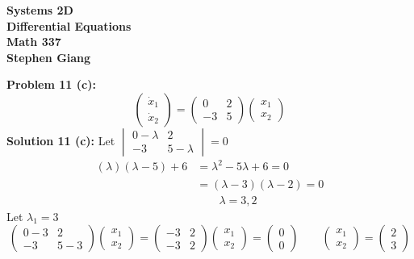 \documentclass[12pt]{article}
\begin{document}
	
	\begin{center}
		\textbf{Systems 2D} \\
		\textbf{Differential Equations} \\
		\textbf{Math 337} \\
		\textbf{Stephen Giang} \\
	\end{center}

\noindent \textbf{Problem 11 (c): } 
$$
\begin{pmatrix}
	\dot{x}_1 \\
	\dot{x}_2
\end{pmatrix} = 
\begin{pmatrix}
	0 & 2 \\
	-3 & 5
\end{pmatrix}
\begin{pmatrix}
	x_1 \\
	x_2
\end{pmatrix}
$$
\noindent \textbf{Solution 11 (c): } Let 
$
\begin{vmatrix}
	0 - \lambda & 2 \\
	-3 & 5 - \lambda
\end{vmatrix} = 0
$
	\begin{align*}
		(\lambda)(\lambda - 5) + 6 &=  \lambda^2 - 5\lambda + 6 = 0 \\
		&= (\lambda - 3)(\lambda - 2) = 0 \\
		& \qquad \lambda = 3, 2
	\end{align*}
Let $\lambda_1 = 3$
$$\begin{pmatrix}
	0 - 3  & 2 \\
	-3 & 5 - 3
\end{pmatrix}
\begin{pmatrix}
	x_1 \\
	x_2
\end{pmatrix} = 
\begin{pmatrix}
	-3 & 2 \\
	-3 & 2
\end{pmatrix}
\begin{pmatrix}
	x_1 \\
	x_2
\end{pmatrix} = 
\begin{pmatrix}
	0 \\
	0
\end{pmatrix} \qquad 
\begin{pmatrix}
	x_1 \\
	x_2
\end{pmatrix} = 
\begin{pmatrix}
	2 \\
	3
\end{pmatrix}$$
\end{document}
